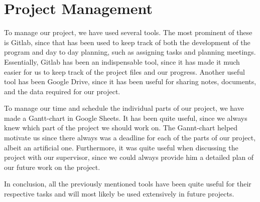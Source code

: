 \section{Project Management}
To manage our project, we have used several tools. The most prominent of these is Gitlab, since that has been used to keep track of both the development of the program and day to day planning, such as assigning tasks and planning meetings. Essentially, Gitlab has been an indispensable tool, since it has made it much easier for us to keep track of the project files and our progress.
Another useful tool has been Google Drive, since it has been useful for sharing notes, documents, and the data required for our project.


To manage our time and schedule the individual parts of our project, we have made a Gantt-chart in Google Sheets. It has been quite useful, since we always knew which part of the project we should work on. The Gannt-chart helped motivate us since there always was a deadline for each of the parts of our project, albeit an artificial one. Furthermore, it was quite useful when discussing the project with our supervisor, since we could always provide him a detailed plan of our future work on the project.

In conclusion, all the previously mentioned tools have been quite useful for their respective tasks and will most likely be used extensively in future projects.